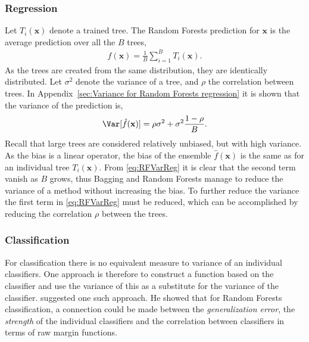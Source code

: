 \subsubsection{Regression}
\label{sub:Regression}

Let $T_i(\mathbf{x})$ denote a trained tree. The Random Forests prediction for $\mathbf{x}$ is the average prediction over all the $B$ trees,
\begin{align}
  \hat f(\mathbf{x}) = \frac{1}{B} \sum_{i = 1}^{B} T_i(\mathbf{x}).
\end{align}
As the trees are created from the same distribution, they are identically distributed. Let $\sigma^2$ denote the variance of a tree, and $\rho$ the correlation between trees. In Appendix~\ref{sec:Variance for Random Forests regression} it is shown that the variance of the prediction is, 
\begin{align}
\label{eq:RFVarReg} 
  \Var[\hat f(\mathbf{x})] = \rho \sigma^2 + \sigma^2 \frac{1-\rho}{B}.
\end{align}
Recall that large trees are considered relatively unbiased, but with high variance. As the bias is a linear operator, the bias of the ensemble $\hat f(\mathbf{x})$ is the same as for an individual tree $T_i(\mathbf{x})$. From \eqref{eq:RFVarReg} it is clear that the second term vanish as $B$ grows, thus Bagging and Random Forests manage to reduce the variance of a method without increasing the bias. To further reduce the variance the first term in \eqref{eq:RFVarReg} must be reduced, which can be accomplished by reducing the correlation $\rho$ between the trees. 

\subsubsection{Classification}
\label{sub:Classification}
For classification there is no equivalent measure to variance of an individual classifiers. One approach is therefore to construct a function based on the classifier and use the variance of this as a substitute for the variance of the classifier. 
\cite{randomforests} suggested one such approach. He showed that for Random Forests classification, a connection could be made between the \textit{generalization error}, the \textit{strength} of the individual classifiers and the correlation between classifiers in terms of raw margin functions. 

